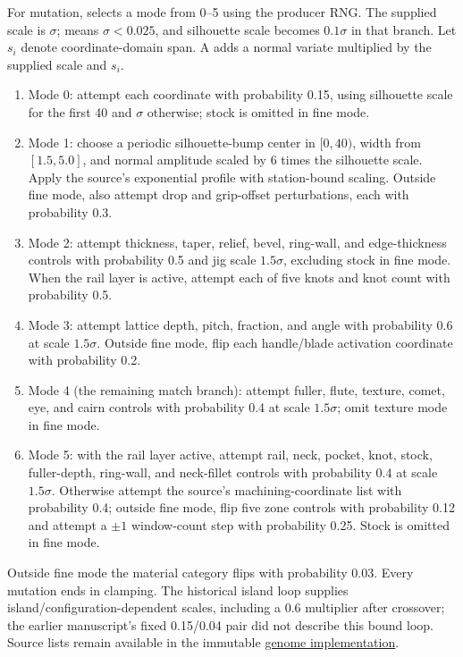 For mutation,  selects a mode from 0--5 using the producer RNG. The supplied scale is $\sigma$;  means $\sigma<0.025$, and silhouette scale becomes $0.1\sigma$ in that branch. Let $s_i$ denote coordinate-domain span. A  adds a normal variate multiplied by the supplied scale and $s_i$.
\begin{enumerate}
\item Mode 0: attempt each coordinate with probability 0.15, using silhouette scale for the first 40 and $\sigma$ otherwise; stock is omitted in fine mode.
\item Mode 1: choose a periodic silhouette-bump center in $[0,40)$, width from $[1.5,5.0]$, and normal amplitude scaled by $6$ times the silhouette scale. Apply the source's exponential profile with station-bound scaling. Outside fine mode, also attempt drop and grip-offset perturbations, each with probability 0.3.
\item Mode 2: attempt thickness, taper, relief, bevel, ring-wall, and edge-thickness controls with probability 0.5 and jig scale $1.5\sigma$, excluding stock in fine mode. When the rail layer is active, attempt each of five knots and knot count with probability 0.5.
\item Mode 3: attempt lattice depth, pitch, fraction, and angle with probability 0.6 at scale $1.5\sigma$. Outside fine mode, flip each handle/blade activation coordinate with probability 0.2.
\item Mode 4 (the remaining match branch): attempt fuller, flute, texture, comet, eye, and cairn controls with probability 0.4 at scale $1.5\sigma$; omit texture mode in fine mode.
\item Mode 5: with the rail layer active, attempt rail, neck, pocket, knot, stock, fuller-depth, ring-wall, and neck-fillet controls with probability 0.4 at scale $1.5\sigma$. Otherwise attempt the source's machining-coordinate list with probability 0.4; outside fine mode, flip five zone controls with probability 0.12 and attempt a $\pm1$ window-count step with probability 0.25. Stock is omitted in fine mode.
\end{enumerate}
Outside fine mode the material category flips with probability 0.03. Every mutation ends in clamping. The historical island loop supplies island/configuration-dependent scales, including a 0.6 multiplier after crossover; the earlier manuscript's fixed 0.15/0.04 pair did not describe this bound loop. Source lists remain available in the immutable \href{https://github.com/neverhuman/jarambit/blob/82f450f7fb418e28c4b229031920dec5454435f3/crates/crescent/src/genome.rs}{genome implementation}.

